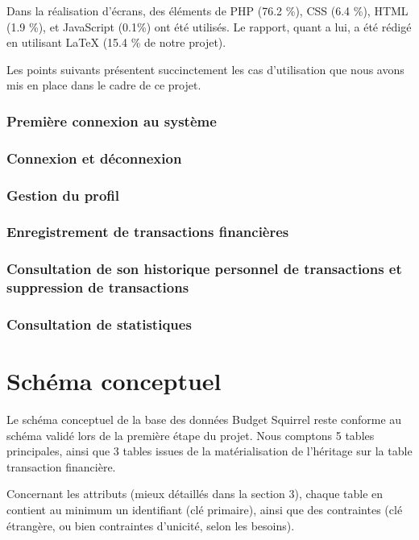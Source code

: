 \documentclass[a4paper,12pt]{article}
\begin{document}
Dans la réalisation d'écrans, des éléments de PHP (76.2 \%), CSS (6.4 \%), HTML (1.9 \%),  et JavaScript (0.1\%) ont été utilisés. Le rapport, quant a lui, a été rédigé en utilisant LaTeX (15.4 \% de notre projet).

Les points suivants présentent succinctement les cas d'utilisation que nous avons mis en place dans le cadre de ce projet.

\subsubsection{Première connexion au système}

\subsubsection{Connexion et déconnexion}

\subsubsection{Gestion du profil}

\subsubsection{Enregistrement de transactions financières}

\subsubsection{Consultation de son historique personnel de transactions et suppression de transactions}

\subsubsection{Consultation de statistiques}

\newpage

\section{Schéma conceptuel}

Le schéma conceptuel de la base des données Budget Squirrel reste conforme au schéma validé lors de la première étape du projet. Nous comptons 5 tables principales, ainsi que 3 tables issues de la matérialisation de l’héritage sur la table transaction financière.

Concernant les attributs (mieux détaillés dans la section 3), chaque table en contient au minimum un identifiant (clé primaire), ainsi que des contraintes (clé étrangère, ou bien contraintes d'unicité, selon les besoins).
\end{document}
